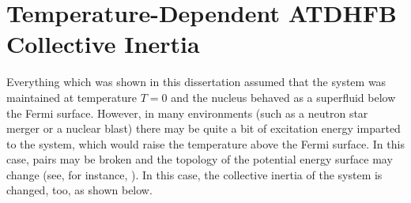 \chapter{Temperature-Dependent ATDHFB Collective Inertia}\label{chap:TD-ATDHFB}

\maketitle

Everything which was shown in this dissertation assumed that the system was maintained at temperature $T=0$ and the nucleus behaved as a superfluid below the Fermi surface. However, in many environments (such as a neutron star merger or a nuclear blast) there may be quite a bit of excitation energy imparted to the system, which would raise the temperature above the Fermi surface. In this case, pairs may be broken and the topology of the potential energy surface may change (see, for instance, \cite{Mcdonnell2014}). In this case, the collective inertia of the system is changed, too, as shown below.